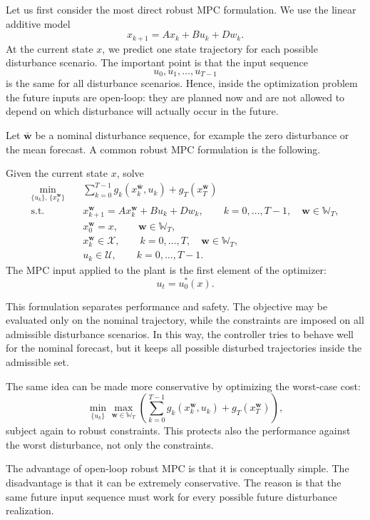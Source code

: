 Let us first consider the most direct robust MPC formulation. We use the linear additive model
\[
x_{k+1}=Ax_k+Bu_k+Dw_k.
\]
At the current state $x$, we predict one state trajectory for each possible disturbance scenario.
The important point is that the input sequence
\[
u_0,u_1,\dots,u_{T-1}
\]
is the same for all disturbance scenarios. Hence, inside the optimization problem the future
inputs are open-loop: they are planned now and are not allowed to depend on which disturbance
will actually occur in the future.

Let $\bar{\mathbf w}$ be a nominal disturbance sequence, for example the zero disturbance or
the mean forecast. A common robust MPC formulation is the following.

\begin{theorembox}
Given the current state $x$, solve
\begin{align*}
\min_{\{u_k\},\,\{x_k^{\mathbf w}\}} \quad
& \sum_{k=0}^{T-1} g_k\left(x_k^{\bar{\mathbf w}},u_k\right)
+ g_T\left(x_T^{\bar{\mathbf w}}\right) \\
\text{s.t.}\quad
& x_{k+1}^{\mathbf w}
= A x_k^{\mathbf w}+Bu_k+D w_k,
\qquad k=0,\dots,T-1,\quad \mathbf w\in\mathbb W_T,\\
& x_0^{\mathbf w}=x,
\qquad \mathbf w\in\mathbb W_T,\\
& x_k^{\mathbf w}\in\mathcal X,
\qquad k=0,\dots,T,\quad \mathbf w\in\mathbb W_T,\\
& u_k\in\mathcal U,
\qquad k=0,\dots,T-1.
\end{align*}
The MPC input applied to the plant is the first element of the optimizer:
\[
u_t = u_0^*(x).
\]
\end{theorembox}

This formulation separates performance and safety. The objective may be evaluated only on
the nominal trajectory, while the constraints are imposed on all admissible disturbance
scenarios. In this way, the controller tries to behave well for the nominal forecast, but it keeps
all possible disturbed trajectories inside the admissible set.

The same idea can be made more conservative by optimizing the worst-case cost:
\[
\min_{\{u_k\}} \max_{\mathbf w\in\mathbb W_T}
\left(
\sum_{k=0}^{T-1} g_k(x_k^{\mathbf w},u_k)+g_T(x_T^{\mathbf w})
\right),
\]
subject again to robust constraints. This protects also the performance against the worst
disturbance, not only the constraints.

The advantage of open-loop robust MPC is that it is conceptually simple. The disadvantage is
that it can be extremely conservative. The reason is that the same future input sequence must
work for every possible future disturbance realization.

